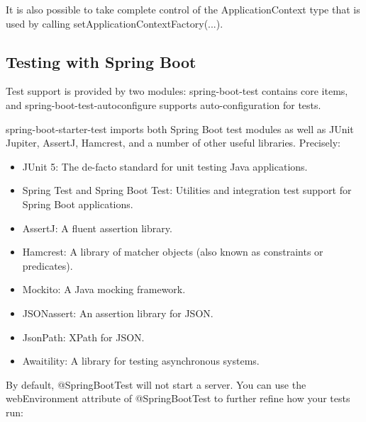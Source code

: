 \documentclass{scrartcl}
\begin{document}
It is also possible to take complete control of the ApplicationContext type that is used by calling setApplicationContextFactory(...).


\subsection{Testing with Spring Boot}

Test support is provided by two modules: spring-boot-test contains core items, and spring-boot-test-autoconfigure supports auto-configuration for tests.

spring-boot-starter-test imports both Spring Boot test modules as well as JUnit Jupiter, AssertJ, Hamcrest, and a number of other useful libraries. Precisely:



\begin{itemize}
    \item JUnit 5: The de-facto standard for unit testing Java applications.

    \item Spring Test and Spring Boot Test: Utilities and integration test support for Spring Boot applications.

    \item AssertJ: A fluent assertion library.

    \item Hamcrest: A library of matcher objects (also known as constraints or predicates).

    \item Mockito: A Java mocking framework.

    \item JSONassert: An assertion library for JSON.

    \item JsonPath: XPath for JSON.

    \item Awaitility: A library for testing asynchronous systems.

\end{itemize}



By default, @SpringBootTest will not start a server. You can use the webEnvironment attribute of @SpringBootTest to further refine how your tests run:
\end{document}
